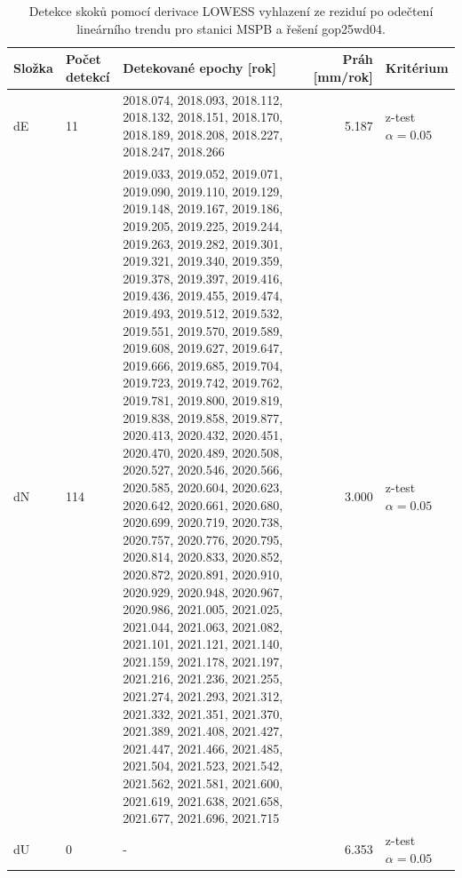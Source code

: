 \begin{table}[htbp]
\caption{Detekce skoků pomocí derivace LOWESS vyhlazení ze reziduí po odečtení lineárního trendu pro stanici MSPB a řešení gop25wd04.}
\label{tab:gop25wd04_stcd_mspb_detr_weighted_1seg_jumps_lowess_derivative}
\begin{tabular}{lllrl}
\toprule
Složka & Počet detekcí & Detekované epochy [rok] & Práh [mm/rok] & Kritérium \\
\midrule
dE & 11 & 2018.074, 2018.093, 2018.112, 2018.132, 2018.151, 2018.170, 2018.189, 2018.208, 2018.227, 2018.247, 2018.266 & 5.187 & z-test $\alpha=0.05$ \\
dN & 114 & 2019.033, 2019.052, 2019.071, 2019.090, 2019.110, 2019.129, 2019.148, 2019.167, 2019.186, 2019.205, 2019.225, 2019.244, 2019.263, 2019.282, 2019.301, 2019.321, 2019.340, 2019.359, 2019.378, 2019.397, 2019.416, 2019.436, 2019.455, 2019.474, 2019.493, 2019.512, 2019.532, 2019.551, 2019.570, 2019.589, 2019.608, 2019.627, 2019.647, 2019.666, 2019.685, 2019.704, 2019.723, 2019.742, 2019.762, 2019.781, 2019.800, 2019.819, 2019.838, 2019.858, 2019.877, 2020.413, 2020.432, 2020.451, 2020.470, 2020.489, 2020.508, 2020.527, 2020.546, 2020.566, 2020.585, 2020.604, 2020.623, 2020.642, 2020.661, 2020.680, 2020.699, 2020.719, 2020.738, 2020.757, 2020.776, 2020.795, 2020.814, 2020.833, 2020.852, 2020.872, 2020.891, 2020.910, 2020.929, 2020.948, 2020.967, 2020.986, 2021.005, 2021.025, 2021.044, 2021.063, 2021.082, 2021.101, 2021.121, 2021.140, 2021.159, 2021.178, 2021.197, 2021.216, 2021.236, 2021.255, 2021.274, 2021.293, 2021.312, 2021.332, 2021.351, 2021.370, 2021.389, 2021.408, 2021.427, 2021.447, 2021.466, 2021.485, 2021.504, 2021.523, 2021.542, 2021.562, 2021.581, 2021.600, 2021.619, 2021.638, 2021.658, 2021.677, 2021.696, 2021.715 & 3.000 & z-test $\alpha=0.05$ \\
dU & 0 & - & 6.353 & z-test $\alpha=0.05$ \\
\bottomrule
\end{tabular}
\end{table}
